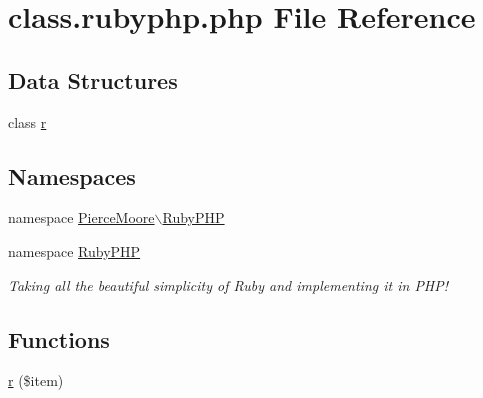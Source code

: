 \hypertarget{class_8rubyphp_8php}{\section{class.\-rubyphp.\-php File Reference}
\label{class_8rubyphp_8php}
}
\subsection*{Data Structures}
\begin{DoxyCompactItemize}
\item 
class \hyperlink{class_pierce_moore_1_1_ruby_p_h_p_1_1r}{r}
\end{DoxyCompactItemize}
\subsection*{Namespaces}
\begin{DoxyCompactItemize}
\item 
namespace \hyperlink{namespace_pierce_moore_1_1_ruby_p_h_p}{Pierce\-Moore$\backslash$\-Ruby\-P\-H\-P}
\item 
namespace \hyperlink{namespace_ruby_p_h_p}{Ruby\-P\-H\-P}
\begin{DoxyCompactList}\small\item\em Taking all the beautiful simplicity of Ruby and implementing it in P\-H\-P! \end{DoxyCompactList}\end{DoxyCompactItemize}
\subsection*{Functions}
\begin{DoxyCompactItemize}
\item 
\hyperlink{namespace_pierce_moore_1_1_ruby_p_h_p_add70f208c72bf2a57bc4ff08438cfed8}{r} (\$item)
\end{DoxyCompactItemize}

